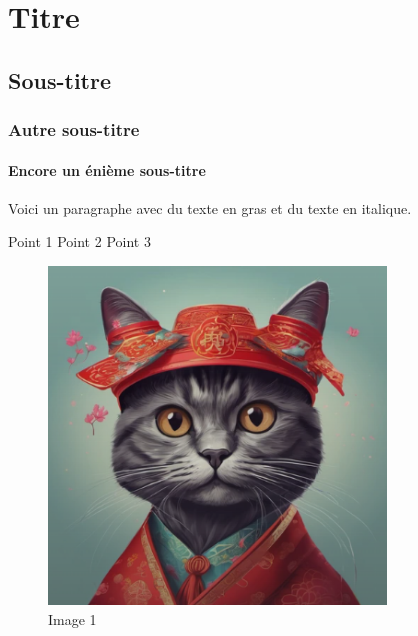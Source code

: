 \documentclass{article}%
\begin{document}
%
\normalsize%
\section{Titre}%
\label{sec:Titre}%
\subsection{Sous{-}titre}%
\label{subsec:Sous{-}titre}%
\subsubsection{Autre sous{-}titre}%
\label{ssubsec:Autresous{-}titre}%

%
\paragraph{Encore un énième sous{-}titre}%
Voici un paragraphe avec du texte en gras et du texte en italique.

%
Point 1%
Point 2%
Point 3

%


\begin{figure}[h!]%
\centering%
\includegraphics[width=0.8\textwidth]{source/image1.png}%
\caption{Image 1}%
\end{figure}

%
\end{document}
